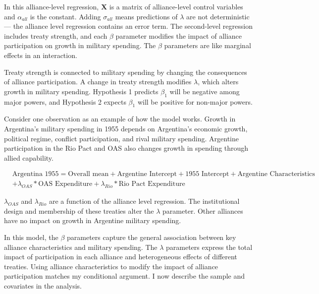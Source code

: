 \documentclass[12pt]{article}
\begin{document}
In this alliance-level regression, $\textbf{X}$ is a matrix of alliance-level control variables and $\alpha_{all}$ is the constant.
Adding $\sigma_{all}$ means predictions of $\lambda$ are not deterministic--- the alliance level regression contains an error term. 
The second-level regression includes treaty strength, and each $\beta$ parameter modifies the impact of alliance participation on growth in military spending. 
The $\beta$ parameters are like marginal effects in an interaction. 


Treaty strength is connected to military spending by changing the consequences of alliance participation. 
A change in treaty strength modifies $\lambda$, which alters growth in military spending.
Hypothesis 1 predicts $\beta_1$ will be negative among major powers, and Hypothesis 2 expects $\beta_1$ will be positive for non-major powers.  


Consider one observation as an example of how the model works. 
Growth in Argentina's military spending in 1955 depends on Argentina's economic growth, political regime, conflict participation, and rival military spending. 
Argentine participation in the Rio Pact and OAS also changes growth in spending through allied capability. 


\begin{equation}
\begin{split}
& \mbox{Argentina 1955} = \mbox{Overall mean}
+ \mbox{Argentine Intercept} + \mbox{1955 Intercept} 
+ \mbox{Argentine Characteristics} \\
& + \lambda_{OAS} * \mbox{OAS Expenditure} + \lambda_{Rio} * \mbox{Rio Pact Expenditure}
\end{split} 
\end{equation}


$\lambda_{OAS}$ and $\lambda_{Rio}$ are a function of the alliance level regression. 
The institutional design and membership of these treaties alter the $\lambda$ parameter.
Other alliances have no impact on growth in Argentine military spending. 


In this model, the $\beta$ parameters capture the general association between key alliance characteristics and military spending. 
The $\lambda$ parameters express the total impact of participation in each alliance and heterogeneous effects of different treaties. 
Using alliance characteristics to modify the impact of alliance participation matches my conditional argument. 
I now describe the sample and covariates in the analysis.  
\end{document}

